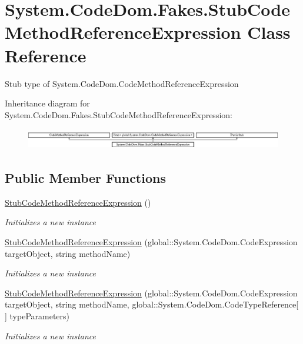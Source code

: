 \hypertarget{class_system_1_1_code_dom_1_1_fakes_1_1_stub_code_method_reference_expression}{\section{System.\-Code\-Dom.\-Fakes.\-Stub\-Code\-Method\-Reference\-Expression Class Reference}
\label{class_system_1_1_code_dom_1_1_fakes_1_1_stub_code_method_reference_expression}
}


Stub type of System.\-Code\-Dom.\-Code\-Method\-Reference\-Expression 


Inheritance diagram for System.\-Code\-Dom.\-Fakes.\-Stub\-Code\-Method\-Reference\-Expression\-:\begin{figure}[H]
\begin{center}
\leavevmode
\includegraphics[height=0.919540cm]{class_system_1_1_code_dom_1_1_fakes_1_1_stub_code_method_reference_expression}
\end{center}
\end{figure}
\subsection*{Public Member Functions}
\begin{DoxyCompactItemize}
\item 
\hyperlink{class_system_1_1_code_dom_1_1_fakes_1_1_stub_code_method_reference_expression_a0cb4d4f170a90d27bd68fdae2f456a20}{Stub\-Code\-Method\-Reference\-Expression} ()
\begin{DoxyCompactList}\small\item\em Initializes a new instance\end{DoxyCompactList}\item 
\hyperlink{class_system_1_1_code_dom_1_1_fakes_1_1_stub_code_method_reference_expression_a4255898e3f6d2d93cd9925e9164c006f}{Stub\-Code\-Method\-Reference\-Expression} (global\-::\-System.\-Code\-Dom.\-Code\-Expression target\-Object, string method\-Name)
\begin{DoxyCompactList}\small\item\em Initializes a new instance\end{DoxyCompactList}\item 
\hyperlink{class_system_1_1_code_dom_1_1_fakes_1_1_stub_code_method_reference_expression_a1adf2ea7a68ae4190dcae44b3ca25aae}{Stub\-Code\-Method\-Reference\-Expression} (global\-::\-System.\-Code\-Dom.\-Code\-Expression target\-Object, string method\-Name, global\-::\-System.\-Code\-Dom.\-Code\-Type\-Reference\mbox{[}$\,$\mbox{]} type\-Parameters)
\begin{DoxyCompactList}\small\item\em Initializes a new instance\end{DoxyCompactList}\end{DoxyCompactItemize}
